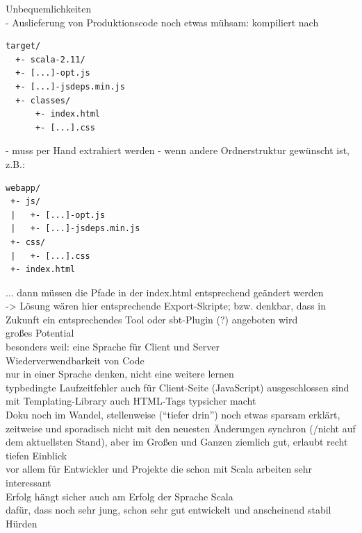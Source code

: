 \documentclass[a4paper, 12pt, hidelinks, listof=totoc, listoftables=totoc, bibliography=totoc]{scrreprt}
\begin{document}
Unbequemlichkeiten \\
  - Auslieferung von Produktionscode noch etwas mühsam: kompiliert nach \\
\begin{lstlisting}
target/
  +- scala-2.11/
  +- [...]-opt.js
  +- [...]-jsdeps.min.js
  +- classes/
      +- index.html
      +- [...].css
\end{lstlisting}
  - muss per Hand extrahiert werden
  - wenn andere Ordnerstruktur gewünscht ist, z.B.:
\begin{lstlisting}
webapp/
 +- js/
 |   +- [...]-opt.js
 |   +- [...]-jsdeps.min.js
 +- css/
 |   +- [...].css
 +- index.html
\end{lstlisting}
  ... dann müssen die Pfade in der index.html entsprechend geändert werden \\
  -> Lösung wären hier entsprechende Export-Skripte; bzw. denkbar, dass in Zukunft ein entsprechendes Tool oder sbt-Plugin (?) angeboten wird \\



großes Potential \\
	besonders weil: eine Sprache für Client und Server \\
		Wiederverwendbarkeit von Code \\
		nur in einer Sprache denken, nicht eine weitere lernen \\
	typbedingte Laufzeitfehler auch für Client-Seite (JavaScript) ausgeschlossen sind \\
	mit Templating-Library auch \ac{HTML}-Tags typsicher macht \\
	
Doku noch im Wandel, stellenweise ("`tiefer drin"') noch etwas sparsam erklärt, zeitweise und sporadisch nicht mit den neuesten Änderungen synchron (/nicht auf dem aktuellsten Stand), aber im Großen und Ganzen ziemlich gut, erlaubt recht tiefen Einblick \\

vor allem für Entwickler und Projekte die schon mit Scala arbeiten sehr interessant \\

Erfolg hängt sicher auch am Erfolg der Sprache Scala \\
dafür, dass noch sehr jung, schon sehr gut entwickelt und anscheinend stabil \\




Hürden \\
\end{document}
